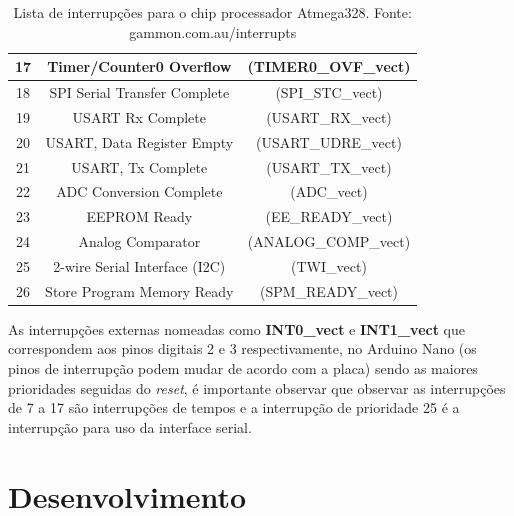 \documentclass[a4paper,12pt,portuguese]{ufms-cpcx}
\begin{document}
\begin{table}[!h]
\begin{tabular}{|c|cc|}
		17 &             Timer/Counter0 Overflow             &  (TIMER0\_OVF\_vect)  \\ \hline
		18 &          SPI Serial Transfer Complete           &   (SPI\_STC\_vect)    \\ \hline
		19 &                USART Rx Complete                &   (USART\_RX\_vect)   \\ \hline
		20 &           USART, Data Register Empty            &  (USART\_UDRE\_vect)  \\ \hline
		21 &               USART, Tx Complete                &   (USART\_TX\_vect)   \\ \hline
		22 &             ADC Conversion Complete             &     (ADC\_vect)      \\ \hline
		23 &                  EEPROM Ready                   &   (EE\_READY\_vect)   \\ \hline
		24 &                Analog Comparator                & (ANALOG\_COMP\_vect)  \\ \hline
		25 &         2-wire Serial Interface  (I2C)          &     (TWI\_vect)      \\ \hline
		26 &           Store Program Memory Ready            &  (SPM\_READY\_vect)   \\ \hline
	\end{tabular}
	\caption[Lista de interrupções]{Lista de interrupções para o chip processador Atmega328. Fonte: gammon.com.au/interrupts}
	\label{Tab:interrupcoes}
\end{table}

As interrupções externas nomeadas como \textbf{INT0\_vect} e \textbf{INT1\_vect} que correspondem aos pinos digitais 2 e 3 respectivamente, no Arduino Nano (os pinos de interrupção podem mudar de acordo com a placa) sendo as maiores prioridades seguidas do \textit{reset}, é importante observar que observar as interrupções de 7 a 17 são interrupções de tempos e a interrupção de prioridade 25 é a interrupção para uso da interface serial.

\chapter{Desenvolvimento}\label{cap:desenvolvimento}
\end{document}
